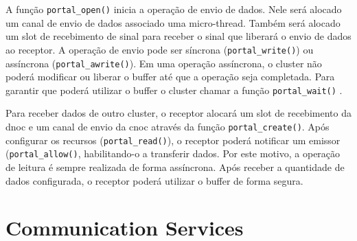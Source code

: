         A função \texttt{portal\_open()} inicia a operação de envio de dados.
        Nele será alocado um canal de envio de dados associado uma micro-thread.
        Também será alocado um slot de recebimento de sinal para receber o sinal que
        liberará o envio de dados ao receptor.
        A operação de envio pode ser síncrona (\texttt{portal\_write()}) ou assíncrona (\texttt{portal\_awrite()}).
        Em uma operação assíncrona, o cluster não poderá modificar ou liberar o buffer até 
        que a operação seja completada.
        Para garantir que poderá utilizar o buffer o cluster chamar a função \texttt{portal\_wait()} .

        Para receber dados de outro cluster, o receptor alocará um slot de recebimento da dnoc
        e um canal de envio da cnoc através da função \texttt{portal\_create()}.
        Após configurar os recursos (\texttt{portal\_read()}), o receptor poderá
        notificar um emissor (\texttt{portal\_allow()}, habilitando-o a transferir dados. 
        Por este motivo, a operação de leitura é sempre realizada de forma assíncrona.
        Após receber a quantidade de dados configurada, o receptor poderá utilizar o buffer de forma segura.

    \section{Communication Services}

